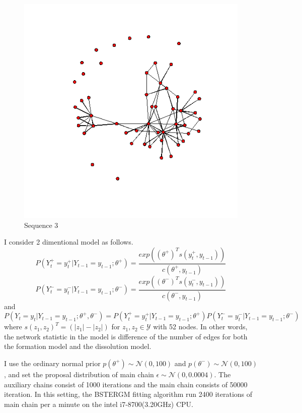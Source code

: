 \documentclass[aspectratio=169,ignorenonframetext,9pt]{beamer}
\theoremstyle{plain}
\theoremstyle{definition}
\begin{document}
\begin{figure}[h]
\begin{center}
    \includegraphics[scale=0.23]{pictures/f3_19_nework.png}
    \caption{Sequence 3}
    \end{center}
\end{figure}
\clearpage

I consider 2 dimentional model as follows.
\[P(Y_t^+=y_t^+|Y_{t-1}=y_{t-1};\theta^+) = \frac{exp((\theta^+)^{T}s(y_t^+, y_{t-1}))}{c(\theta^+, y_{t-1})}\]
\[P(Y_t^-=y_t^-|Y_{t-1}=y_{t-1};\theta^-) = \frac{exp((\theta^-)^{T}s(y_t^-, y_{t-1}))}{c(\theta^-, y_{t-1})}\]
and
\[P(Y_t=y_t|Y_{t-1}=y_{t-1};\theta^+,\theta^-)=P(Y_t^+=y_t^+|Y_{t-1}=y_{t-1};\theta^+) P(Y_t^-=y_t^-|Y_{t-1}=y_{t-1};\theta^-)\]
where
\(s(z_1,z_2)^T=(|z_1|-|z_2|)\)
for $z_1,z_2\in\mathcal{Y}$ with 52 nodes. In other words, the network statistic in the model is
difference of the number of edges for both the formation model and the dissolution model.

I use the ordinary normal prior $p(\theta^+)\sim\mathcal{N}(0,100)$ and $p(\theta^-)\sim\mathcal{N}(0,100)$,
and set the proposal distribution of main chain $\epsilon\sim\mathcal{N}(0,0.0004)$.
The auxiliary chains consist of 1000 iterations and the main chain consists of 50000 iteration.
In this setting, the BSTERGM fitting algorithm run 2400 iterations of main chain per a minute on the intel i7-8700(3.20GHz) CPU.
\end{document}
